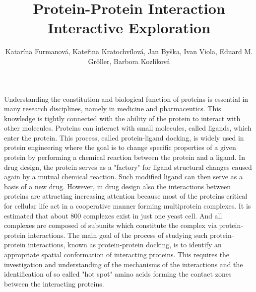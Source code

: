 \documentclass[journal]{vgtc}                %
\title{Protein-Protein Interaction Interactive Exploration}
\author{Katar\'{i}na Furmanov\'{a}, Kate\v{r}ina Kratochv\'{i}lov\'{a}, Jan By\v{s}ka, Ivan Viola, Eduard M. Gr\"{o}ller, Barbora Kozl\'{i}kov\'{a}}
\begin{document}


\maketitle
Understanding the constitution and biological function of proteins is essential in many research disciplines, namely in medicine and pharmaceutics.
This knowledge is tightly connected with the ability of the protein to interact with other molecules.
Proteins can interact with small molecules, called ligands, which enter the protein.
This process, called protein-ligand docking, is widely used in protein engineering where the goal is to change specific properties of a given protein by performing a chemical reaction between the protein and a ligand.
In drug design, the protein serves as a "factory" for ligand structural changes caused again by a mutual chemical reaction. 
Such modified ligand can then serve as a basis of a new drug. 
However, in drug design also the interactions between proteins are attracting increasing attention because most of the proteins critical for cellular life act in a cooperative manner forming multiprotein complexes. 
It is estimated that about 800 complexes exist in just one yeast cell. 
And all complexes are composed of subunits which constitute the complex via protein-protein interactions.
The main goal of the process of studying such protein-protein interactions, known as protein-protein docking, is to identify an appropriate spatial conformation of interacting proteins.
This requires the investigation and understanding of the mechanisms of the interactions and the identification of so called "hot spot" amino acids forming the contact zones between the interacting proteins.
\end{document}
